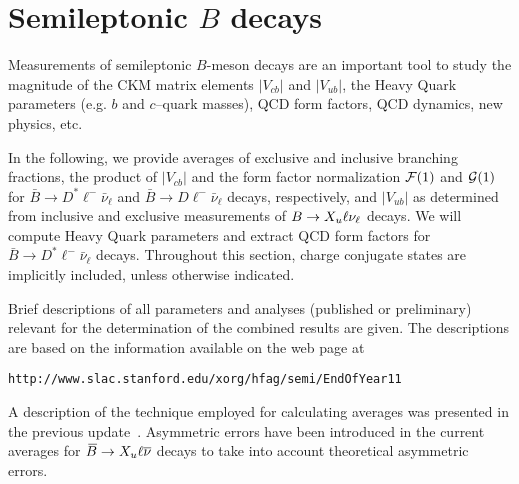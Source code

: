 

\section{Semileptonic $B$ decays}
\label{sec:slbdecays}

Measurements of semileptonic $B$-meson decays are an important tool to
study the magnitude of the CKM matrix elements $|V_{cb}|$ and
$|V_{ub}|$, the Heavy Quark parameters (e.g. $b$ and $c$--quark masses),
QCD form factors, QCD dynamics, new physics, etc.

In the following, we provide averages of exclusive and inclusive
 branching fractions, the product of $|V_{cb}|$ and the form factor
 normalization ${\cal F}(1)$ and ${\cal G}(1)$ for $\bar{B} \to D^* \ell^-\bar{\nu}_{\ell}$ and
$\bar{B} \to D \ell^-\bar{\nu}_{\ell}$ decays, respectively, and $|V_{ub}|$ as determined from
inclusive and exclusive measurements of $B\to X_u \ell \nu_\ell$ decays.
We will compute Heavy Quark parameters and extract QCD form factors
for $\bar{B} \to D^* \ell^-\bar{\nu}_{\ell}$ decays.
Throughout this section, charge conjugate states are implicitly included, 
unless otherwise indicated.

Brief descriptions of all parameters
and analyses (published or preliminary) relevant for the
determination of the combined results are given.  The descriptions are
based on the information available on the web page at\\
 \centerline{\tt http://www.slac.stanford.edu/xorg/hfag/semi/EndOfYear11}
A description of the technique employed for calculating averages
was presented in the previous update~\cite{Barberio:2008fa}. 
Asymmetric errors have been introduced in the current averages
for $\kern 0.18em\overline{\kern -0.18em B}{}\to X_u\ell\overline{\nu}$ decays to take into account theoretical 
asymmetric errors. 



